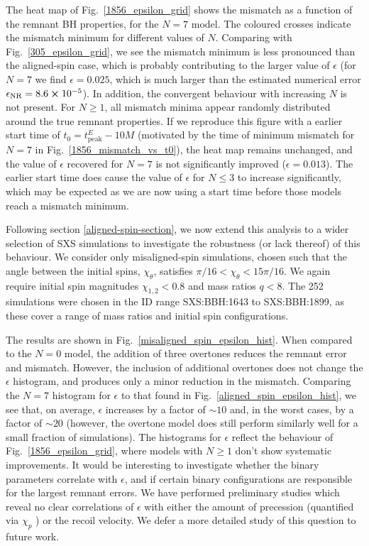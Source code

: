 The heat map of Fig.~\ref{1856_epsilon_grid} shows the mismatch as a function of the remnant BH properties, for the $N=7$ model.
The coloured crosses indicate the mismatch minimum for different values of $N$. 
Comparing with Fig.~\ref{305_epsilon_grid}, we see the mismatch minimum is less pronounced than the aligned-spin case, which is probably contributing to the larger value of $\epsilon$ (for $N=7$ we find $\epsilon = 0.025$, which is much larger than the estimated numerical error $\epsilon_{\mathrm{NR}} = 8.6 \cross 10^{-5}$). 
In addition, the convergent behaviour with increasing $N$ is not present. For $N \geq 1$, all mismatch minima appear randomly distributed around the true remnant properties.
If we reproduce this figure with a earlier start time of $t_0 = t_{\mathrm{peak}}^{\dot{E}} - 10M$ (motivated by the time of minimum mismatch for $N=7$ in Fig.~\ref{1856_mismatch_vs_t0}), the heat map remains unchanged, and the value of $\epsilon$ recovered for $N=7$ is not significantly improved ($\epsilon = 0.013$). The earlier start time does cause the value of $\epsilon$ for $N \leq 3$ to increase significantly, which may be expected as we are now using a start time before those models reach a mismatch minimum. 

Following section \ref{aligned-spin-section}, we now extend this analysis to a wider selection of SXS simulations to investigate the robustness (or lack thereof) of this behaviour. We consider only misaligned-spin simulations, chosen such that the angle between the initial spins, $\chi_{\theta}$, satisfies $\pi/16 < \chi_{\theta} < 15\pi/16$. We again require initial spin magnitudes $\chi_{1,2} < 0.8$ and mass ratios $q<8$. The 252 simulations were chosen in the ID range SXS:BBH:1643 to SXS:BBH:1899, as these cover a range of mass ratios and initial spin configurations.

The results are shown in Fig.~\ref{misaligned_spin_epsilon_hist}. 
When compared to the $N=0$ model, the addition of three overtones reduces the remnant error and mismatch. 
However, the inclusion of additional overtones does not change the $\epsilon$ histogram, and produces only a minor reduction in the mismatch.
Comparing the $N=7$ histogram for $\epsilon$ to that found in Fig.~\ref{aligned_spin_epsilon_hist}, we see that, on average, $\epsilon$ increases by a factor of $\sim 10$ and, in the worst cases, by a factor of $\sim 20$ (however, the overtone model does still perform similarly well for a small fraction of simulations). 
The histograms for $\epsilon$ reflect the behaviour of Fig.~\ref{1856_epsilon_grid}, where models with $N \geq 1$ don't show systematic improvements. 
It would be interesting to investigate whether the binary parameters correlate with $\epsilon$, and if certain binary configurations are responsible for the largest remnant errors. We have performed preliminary studies which reveal no clear correlations of $\epsilon$ with either the amount of precession (quantified via $\chi_p$ \cite{Schmidt:2014iyl}) or the recoil velocity. We defer a more detailed study of this question to future work.

